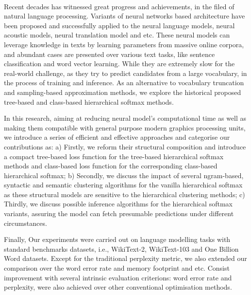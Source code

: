 \documentclass[master,openright,oneside,color]{buaathesis}
\begin{document}
\begin{eabstract}
~\

Recent decades has witnessed great progress and achievements, in the filed of natural language processing. Variants of neural networks based architecture have been proposed and successfully applied to the neural language models, neural acoustic models, neural translation model and etc. These neural models can leverage knowledge in texts by learning parameters from massive online corpora, and abundant cases are presented over various text tasks, like sentence classification and word vector learning. While they are extremely slow for the real-world challenge, as they try to predict candidates from a large vocabulary, in the process of training and inference. As an alternative to vocabulary truncation and sampling-based approximation methods, we explore the historical proposed tree-based and class-based hierarchical softmax methods.

In this research, aiming at reducing neural model's computational time as well as making them compatible with general purpose modern graphics processing units, we introduce a series of efficient and effective approaches and categorise our contributions as: a) Firstly, we reform their structural composition and introduce a compact tree-based loss function for the tree-based hierarchical softmax methods and class-based loss function for the corresponding class-based hierarchical softmax; b) Secondly, we discuss the impact of several ngram-based, syntactic and semantic clustering algorithms for the vanilla hierarchical softmax as these structural models are sensitive to the hierarchical clustering methods; c) Thirdly, we discuss possible inference algorithms for the hierarchical softmax variants, assuring the model can fetch presumable predictions under different circumstances.

Finally, Our experiments were carried out on language modelling tasks with standard benchmarks datasets, i.e., WikiText-2, WikiText-103 and One Billion Word datasets. Except for the traditional perplexity metric, we also extended our comparison over the word error rate and memory footprint and etc. Consist improvement with several intrinsic evaluation criterions: word error rate and perplexity, were also achieved over other conventional optimisation methods.
\end{eabstract}
\tableofcontents
\listoffigures
\listoftables

\mainmatter
\pagestyle{mainmatter}








\cleardoublepage
{}
{}
\nocite{*}

\cleardoublepage


\backmatter

\end{document}
